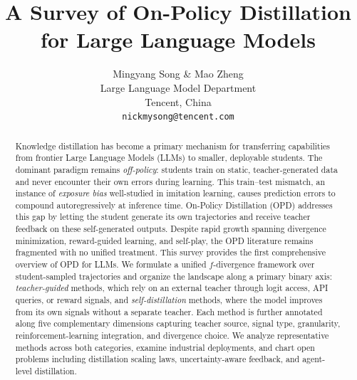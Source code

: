 \documentclass{article} %
\title{A Survey of On-Policy Distillation for Large Language Models}
\author{Mingyang Song \& Mao Zheng \\
Large Language Model Department \\Tencent, China\\
\texttt{nickmysong@tencent.com}}
\begin{document}
\ifcolmsubmission
\linenumbers
\fi

\maketitle




\begin{abstract}
Knowledge distillation has become a primary mechanism for transferring capabilities from frontier Large Language Models (LLMs) to smaller, deployable students. The dominant paradigm remains \textit{off-policy}: students train on static, teacher-generated data and never encounter their own errors during learning. This train--test mismatch, an instance of \textit{exposure bias} well-studied in imitation learning, causes prediction errors to compound autoregressively at inference time.
On-Policy Distillation (OPD) addresses this gap by letting the student generate its own trajectories and receive teacher feedback on these self-generated outputs. Despite rapid growth spanning divergence minimization, reward-guided learning, and self-play, the OPD literature remains fragmented with no unified treatment.
This survey provides the first comprehensive overview of OPD for LLMs. We formulate a unified $f$-divergence framework over student-sampled trajectories and organize the landscape along a primary binary axis: \emph{teacher-guided} methods, which rely on an external teacher through logit access, API queries, or reward signals, and \emph{self-distillation} methods, where the model improves from its own signals without a separate teacher. Each method is further annotated along five complementary dimensions capturing teacher source, signal type, granularity, reinforcement-learning integration, and divergence choice. We analyze representative methods across both categories, examine industrial deployments, and chart open problems including distillation scaling laws, uncertainty-aware feedback, and agent-level distillation.
\end{abstract}

\vspace{-0.3em}
\begin{center}
\end{center}
\vspace{-0.3em}
\end{document}
